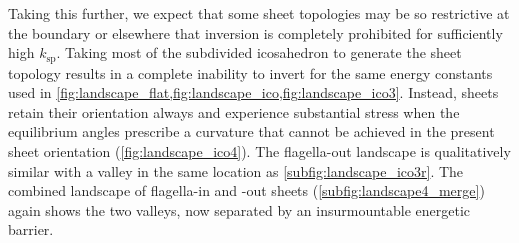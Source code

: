 Taking this further, we expect that some sheet topologies may be so restrictive at the boundary or elsewhere that inversion is completely prohibited for sufficiently high $k_{\text{sp}}$. 
Taking most of the subdivided icosahedron to generate the sheet topology results in a complete inability to invert for the same energy constants used in \cref{fig:landscape_flat,fig:landscape_ico,fig:landscape_ico3}.
Instead, sheets retain their orientation always and experience substantial stress when the equilibrium angles prescribe a curvature that cannot be achieved in the present sheet orientation (\cref{fig:landscape_ico4}).
The flagella-out landscape is qualitatively similar with a valley in the same location as \cref{subfig:landscape_ico3r}.
The combined landscape of flagella-in and -out sheets (\cref{subfig:landscape4_merge}) again shows the two valleys, now separated by an insurmountable energetic barrier.

